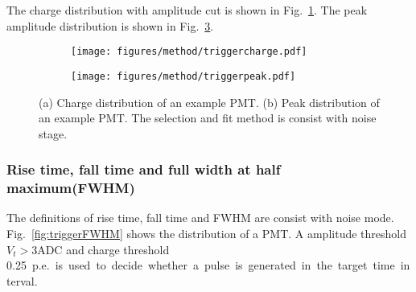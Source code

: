 The charge distribution with amplitude cut is shown in Fig.~\ref{fig:triggercharge}. The peak amplitude distribution is shown in Fig.~\ref{fig:triggerpeak}. 
\begin{figure}[!htbp]
    \centering
    \begin{subfigure}[b]{0.45\textwidth}
        \texttt{[image: figures/method/triggercharge.pdf]}
        \caption{}%
        \label{fig:triggercharge}
    \end{subfigure}
    \begin{subfigure}[b]{0.45\textwidth}
        \texttt{[image: figures/method/triggerpeak.pdf]}
        \caption{}%
        \label{fig:triggerpeak}
    \end{subfigure}
    \caption{(a) Charge distribution of an example PMT. (b) Peak distribution of an example PMT. The selection and fit method is consist with noise stage.}
\end{figure}

\subsubsection{Rise time, fall time and full width at half maximum(FWHM)}
\label{sec:triggerFWHM}
The definitions of rise time, fall time and FWHM are consist with noise mode. Fig.~\ref{fig:triggerFWHM} shows the distribution of a PMT. A amplitude threshold $V_{t}>3\mathrm{ADC}$ and charge threshold \SI{0.25}{p.e.} is used to decide whether a pulse is generated in the target time interval.
\begin{figure}[!htbp]
    \centering
    
\end{figure}
